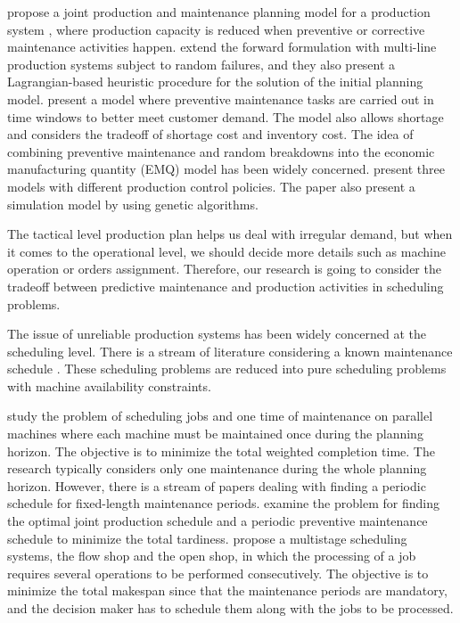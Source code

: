 \documentclass[12pt,a4page]{article}
\theoremstyle{definition}
\theoremstyle{remark}
\begin{document}
\citet*{aghezzaf2007} propose a joint production and maintenance planning model for a production system , where production capacity is reduced when preventive or corrective maintenance activities happen.
\citet*{aghezzaf2008} extend the forward formulation with multi-line production systems subject to random failures, and they also present a Lagrangian-based heuristic procedure for the solution of the initial planning model.
\citet*{najid2011} present a model where preventive maintenance tasks are carried out in time windows to better meet customer demand. The model also allows shortage and considers the tradeoff of shortage cost and inventory cost.
The idea of combining preventive maintenance and random breakdowns into the economic manufacturing quantity (EMQ) model has been widely concerned. \citet*{rezg2004} present three models with different production control policies. The paper also present a simulation model by using genetic algorithms.


The tactical level production plan helps us  deal with irregular demand, but when it comes to the operational level, we should decide more details such as machine operation or orders assignment. Therefore, our research is going to consider the tradeoff between predictive maintenance and production activities in scheduling problems.

The issue of unreliable production systems has been widely concerned at the scheduling level. There is a stream of literature considering a known maintenance schedule \citep{lee1996,schmidt2000,ma2010}. These scheduling problems are reduced into pure scheduling problems with machine availability constraints.

	\citet*{lee2000} study the problem of scheduling jobs and one time of maintenance on parallel machines where each machine must be maintained once during the planning horizon. The objective is to minimize the total weighted completion time. The research typically considers only one maintenance during the whole planning horizon. However, there is a stream of papers dealing with finding a periodic schedule for fixed-length maintenance periods. \citet*{cassady2005} examine the problem for finding the optimal joint production schedule and a periodic preventive maintenance schedule to minimize the total tardiness.
\citet*{kubzin2006} propose a multistage scheduling systems, the flow shop and the open shop, in which the processing of a job requires several operations to be performed consecutively. The objective is to minimize the total makespan since that the maintenance periods are mandatory, and the decision maker has to schedule them along with the jobs to be processed.
\end{document}
